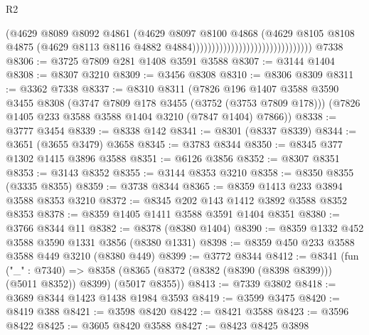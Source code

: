 \begin{lexlean}{R2}
\begin{coremodule}
                                                          (@4629
                                                            @8089
                                                            @8092
                                                            @4861
                                                            (@4629
                                                              @8097
                                                              @8100
                                                              @4868
                                                              (@4629
                                                                @8105
                                                                @8108
                                                                @4875
                                                                (@4629
                                                                  @8113
                                                                  @8116
                                                                  @4882
                                                                  @4884)))))))))))))))))))))))))))))))
    @7338
@8306 := @3725 @7809 @281 @1408 @3591 @3588
@8307 := @3144 @1404
@8308 := @8307 @3210
@8309 := @3456 @8308
@8310 := @8306 @8309
@8311 := @3362 @7338
@8337 := @8310
    @8311
    (@7826
      @196
      @1407
      @3588
      @3590
      @3455
      @8308
      (@3747 @7809 @178 @3455 (@3752 (@3753 @7809 @178)))
      (@7826 @1405 @233 @3588 @3588 @1404 @3210 (@7847 @1404) @7866))
@8338 := @3777 @3454
@8339 := @8338 @142
@8341 := @8301 (@8337 @8339)
@8344 := @3651 (@3655 @3479) @3658
@8345 := @3783 @8344
@8350 := @8345 @377 @1302 @1415 @3896 @3588
@8351 := @6126 @3856
@8352 := @8307 @8351
@8353 := @3143 @8352
@8355 := @3144 @8353 @3210
@8358 := @8350 @8355 (@3335 @8355)
@8359 := @3738 @8344
@8365 := @8359 @1413 @233 @3894 @3588 @8353 @3210
@8372 := @8345 @202 @143 @1412 @3892 @3588 @8352 @8353
@8378 := @8359 @1405 @1411 @3588 @3591 @1404 @8351
@8380 := @3766 @8344 @11
@8382 := @8378 (@8380 @1404)
@8390 := @8359 @1332 @452 @3588 @3590 @1331 @3856 (@8380 @1331)
@8398 := @8359 @450 @233 @3588 @3588 @449 @3210 (@8380 @449)
@8399 := @3772 @8344
@8412 := @8341
    (fun ("_" : @7340) =>
    @8358 (@8365 (@8372 (@8382 (@8390 (@8398 @8399))) (@5011 @8352)) @8399) (@5017 @8355))
@8413 := @7339 @3802
@8418 := @3689 @8344 @1423 @1438 @1984 @3593
@8419 := @3599 @3475
@8420 := @8419 @388
@8421 := @3598 @8420
@8422 := @8421 @3588
@8423 := @3596 @8422
@8425 := @3605 @8420 @3588
@8427 := @8423 @8425 @3898

\end{coremodule}
\end{lexlean}
